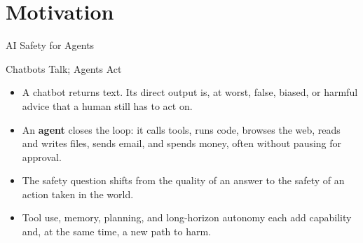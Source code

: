 \section{Motivation}

\begin{frame}[plain, c]
  \centering
  \vspace{4em}
  {\Huge AI Safety for Agents}
\end{frame}

\begin{frame}{Chatbots Talk; Agents Act}
  \begin{itemize}\itemsep0.6em
    \item[\textcolor{KAred}{$\blacktriangleright$}] A chatbot returns text. Its direct output is, at worst, false, biased, or harmful advice that a human still has to act on.
    \item[\textcolor{KAred}{$\blacktriangleright$}] An \textbf{agent} closes the loop: it calls tools, runs code, browses the web, reads and writes files, sends email, and spends money, often without pausing for approval.
    \item[\textcolor{KAred}{$\blacktriangleright$}] The safety question shifts from the quality of an answer to the safety of an action taken in the world.
    \item[\textcolor{KAred}{$\blacktriangleright$}] Tool use, memory, planning, and long-horizon autonomy each add capability and, at the same time, a new path to harm.
  \end{itemize}
\end{frame}

